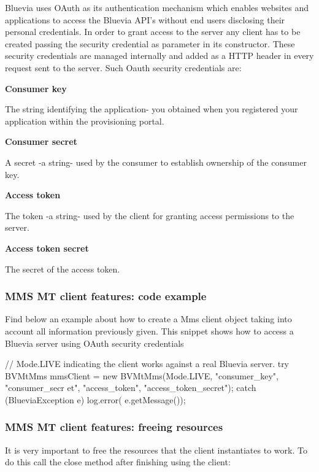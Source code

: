Bluevia uses OAuth as its authentication mechanism which enables websites and applications to access the Bluevia API's without end users disclosing their personal credentials. In order to grant access to the server any client has to be created passing the security credential as parameter in its constructor. These security credentials are managed internally and added as a HTTP header in every request sent to the server. Such Oauth security credentials are: 
\begin{DoxyItemize}
\item {\bfseries Consumer key} \par
The string identifying the application-\/ you obtained when you registered your application within the provisioning portal.


\item {\bfseries Consumer secret} \par
A secret -\/a string-\/ used by the consumer to establish ownership of the consumer key.


\item {\bfseries Access token} \par
The token -\/a string-\/ used by the client for granting access permissions to the server.


\item {\bfseries Access token secret} \par
The secret of the access token. 
\end{DoxyItemize}\hypertarget{blv_mms_mt_guide_mms_mt_client_features_code_examples_sec}{}\subsubsection{MMS MT client features: code example}\label{blv_mms_mt_guide_mms_mt_client_features_code_examples_sec}
Find below an example about how to create a Mms client object taking into account all information previously given. This snippet shows how to access a Bluevia server using OAuth security credentials


\begin{DoxyCode}
// Mode.LIVE indicating the client works against a real Bluevia server.
try {
        BVMtMms mmsClient = new BVMtMms(Mode.LIVE, "consumer_key", "consumer_secr
      et", "access_token", "access_token_secret");
} catch (BlueviaException e){
        log.error( e.getMessage());
}
\end{DoxyCode}
\hypertarget{blv_mms_mt_guide_mms_mt_client_features_freeing_resources_sec}{}\subsubsection{MMS MT client features: freeing resources}\label{blv_mms_mt_guide_mms_mt_client_features_freeing_resources_sec}
It is very important to free the resources that the client instantiates to work. To do this call the close method after finishing using the client:


